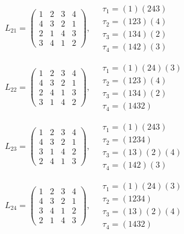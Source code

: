 $L_{21} = \begin{pmatrix} 1 & 2 & 3 & 4 \\ 4 & 3 & 2 & 1 \\ 2 & 1 & 4 & 3 \\ 3 & 4 & 1 & 2 \end{pmatrix}, \quad \begin{matrix} \tau_{1} = (1)(2 4 3) \\ \tau_{2} = (1 2 3)(4) \\ \tau_{3} = (1 3 4)(2) \\ \tau_{4} = (1 4 2)(3) \end{matrix}$

$L_{22} = \begin{pmatrix} 1 & 2 & 3 & 4 \\ 4 & 3 & 2 & 1 \\ 2 & 4 & 1 & 3 \\ 3 & 1 & 4 & 2 \end{pmatrix}, \quad \begin{matrix} \tau_{1} = (1)(2 4)(3) \\ \tau_{2} = (1 2 3)(4) \\ \tau_{3} = (1 3 4)(2) \\ \tau_{4} = (1 4 3 2) \end{matrix}$

$L_{23} = \begin{pmatrix} 1 & 2 & 3 & 4 \\ 4 & 3 & 2 & 1 \\ 3 & 1 & 4 & 2 \\ 2 & 4 & 1 & 3 \end{pmatrix}, \quad \begin{matrix} \tau_{1} = (1)(2 4 3) \\ \tau_{2} = (1 2 3 4) \\ \tau_{3} = (1 3)(2)(4) \\ \tau_{4} = (1 4 2)(3) \end{matrix}$

$L_{24} = \begin{pmatrix} 1 & 2 & 3 & 4 \\ 4 & 3 & 2 & 1 \\ 3 & 4 & 1 & 2 \\ 2 & 1 & 4 & 3 \end{pmatrix}, \quad \begin{matrix} \tau_{1} = (1)(2 4)(3) \\ \tau_{2} = (1 2 3 4) \\ \tau_{3} = (1 3)(2)(4) \\ \tau_{4} = (1 4 3 2) \end{matrix}$

